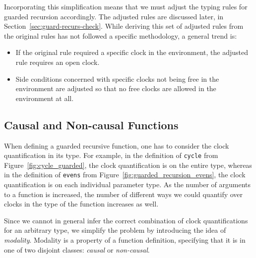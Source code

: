 Incorporating this simplification means that we must adjust the typing rules for
guarded recursion accordingly. The adjusted rules are discussed later, in
Section~\ref{sec:guard-recurs-check}. While deriving this set of adjusted rules
from the original rules has not followed a specific methodology, a general trend
is:

\begin{itemize}
\item If the original rule required a specific clock in the environment, the
  adjusted rule requires an open clock.
\item Side conditions concerned with specific clocks not being free in the
  environment are adjusted so that no free clocks are allowed in the
  environment at all.
\end{itemize}


\subsection{Causal and Non-causal Functions}
\label{sec:causal-non-causal}
When defining a guarded recursive function, one has to consider the clock
quantification in its type. For example, in the definition of \texttt{cycle}
from Figure~\ref{fig:cycle_guarded}, the clock quantification is on the entire
type, whereas in the definition of \texttt{evens} from
Figure~\ref{fig:guarded_recursion_evens}, the clock quantification is on each
individual parameter type. As the number of arguments to a function is
increased, the number of different ways we could quantify over clocks in the
type of the function increases as well.

Since we cannot in general infer the correct combination of clock
quantifications for an arbitrary type, we simplify the problem by introducing
the idea of \emph{modality}. Modality is a property of a function definition,
specifying that it is in one of two disjoint classes: \emph{causal} or
\emph{non-causal}. 

